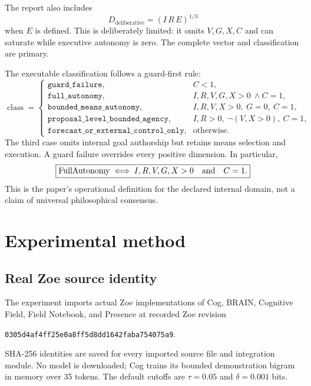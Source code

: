 The report also includes
\begin{equation}
D_{\mathrm{deliberative}}=(I\,R\,E)^{1/3}
\label{eq:deliberative}
\end{equation}
when $E$ is defined. This is deliberately limited: it omits $V,G,X,C$ and can saturate while executive autonomy is zero. The complete vector and classification are primary.

The executable classification follows a guard-first rule:
\begin{equation}
\operatorname{class}=
\begin{cases}
\texttt{guard\_failure},&C<1,\\
\texttt{full\_autonomy},&I,R,V,G,X>0\ \land C=1,\\
\texttt{bounded\_means\_autonomy},&I,R,V,X>0,\ G=0,\ C=1,\\
\texttt{proposal\_level\_bounded\_agency},&I,R>0,\ \neg(V,X>0),\ C=1,\\
\texttt{forecast\_or\_external\_control\_only},&\text{otherwise}.
\end{cases}
\label{eq:classification}
\end{equation}
The third case omits internal goal authorship but retains means selection and execution. A guard failure overrides every positive dimension. In particular,
\begin{equation}
\boxed{\operatorname{FullAutonomy}\iff I,R,V,G,X>0\quad\text{and}\quad C=1.}
\label{eq:full-autonomy}
\end{equation}
This is the paper's operational definition for the declared internal domain, not a claim of universal philosophical consensus.

\section{Experimental method}
\subsection{Real Zoe source identity}
The experiment imports actual Zoe implementations of Cog, BRAIN, Cognitive Field, Field Notebook, and Presence at recorded Zoe revision
\begin{center}
\texttt{0305d4af4ff25e0a8ff5d8dd1642faba754075a9}.
\end{center}
SHA-256 identities are saved for every imported source file and integration module. No model is downloaded; Cog trains its bounded demonstration bigram in memory over 35 tokens. The default cutoffs are $\tau=0.05$ and $\delta=0.001$ bits.

